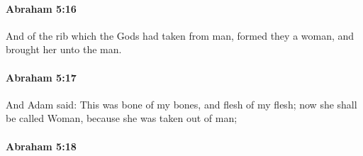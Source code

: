 		\paragraph{Abraham 5:16} %
			\label{ABRAHAM-5-16}

			And of the rib which the Gods had taken from man, formed they a woman, and brought her unto the man.


		\paragraph{Abraham 5:17} %
			\label{ABRAHAM-5-17}

			And Adam said: This was bone of my bones, and flesh of my flesh; now she shall be called Woman, because she was taken out of man;


		\paragraph{Abraham 5:18} %
			\label{ABRAHAM-5-18}

